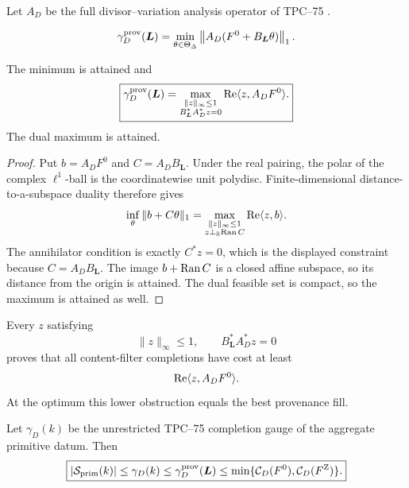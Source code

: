 Let \(A_D\) be the full divisor--variation analysis operator of TPC--75
\citep{WangTPC75}.

\begin{definition}
\label{def:provenance-gauge}
\[
 \gamma_D^{\rm prov}(\boldsymbol L)
 =
 \min_{\theta\in\Theta_\Delta}
 \left\|
 A_D(F^0+B_{\boldsymbol L}\theta)
 \right\|_1.
\]
\end{definition}

\begin{theorem}
\label{thm:content-flow-dual}
The minimum is attained and
\begin{equation}
 \boxed{
 \gamma_D^{\rm prov}(\boldsymbol L)
 =
 \max_{\substack{\|z\|_\infty\le1\\
 B_{\boldsymbol L}^*A_D^*z=0}}
 \operatorname{Re}\langle z,A_DF^0\rangle.}
 \label{eq:content-flow-dual}
\end{equation}
The dual maximum is attained.
\end{theorem}

\begin{proof}
Put \(b=A_DF^0\) and \(C=A_DB_{\boldsymbol L}\).  Under the real
pairing, the polar of the complex \(\ell^1\)-ball is the coordinatewise
unit polydisc.  Finite-dimensional distance-to-a-subspace duality
therefore gives
\[
 \inf_\theta\|b+C\theta\|_1
 =
 \max_{\substack{\|z\|_\infty\le1\\
 z\perp_{\mathbb R}\operatorname{Ran} C}}
 \operatorname{Re}\langle z,b\rangle.
\]
The annihilator condition is exactly \(C^*z=0\), which is the displayed
constraint because \(C=A_DB_{\boldsymbol L}\).  The image
\(b+\operatorname{Ran} C\) is a closed affine subspace, so its distance from the
origin is attained.  The dual feasible set is compact, so the maximum
is attained as well.
\end{proof}

\begin{corollary}
\label{cor:provenance-obstruction}
Every \(z\) satisfying
\[
 \|z\|_\infty\le1,
 \qquad
 B_{\boldsymbol L}^*A_D^*z=0
\]
proves that all content-filter completions have cost at least
\[
 \operatorname{Re}\langle z,A_DF^0\rangle.
\]
At the optimum this lower obstruction equals the best provenance fill.
\end{corollary}

\begin{corollary}
\label{cor:completion-hierarchy}
Let \(\gamma_D(k)\) be the unrestricted TPC--75 completion gauge of the
aggregate primitive datum.  Then
\begin{equation}
 \boxed{
 |\mathcal S_{\rm prim}(k)|
 \le
 \gamma_D(k)
 \le
 \gamma_D^{\rm prov}(\boldsymbol L)
 \le
 \min\{\mathcal C_D(F^0),\mathcal C_D(F^{\rm Z})\}.}
 \label{eq:completion-hierarchy}
\end{equation}
\end{corollary}

